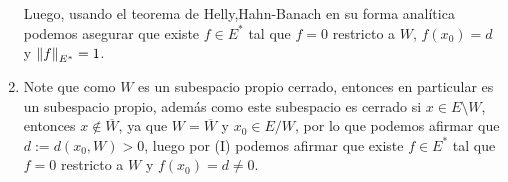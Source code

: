 \begin{homeworkProblem}
\begin{solution}
\begin{enumerate}
\begin{itemize}
        \end{itemize}
        Luego, usando el teorema de Helly,Hahn-Banach en su forma analítica podemos asegurar que existe $f\in E^{*}$ tal que $f=0$ restricto a $W$, $f(x_0)=d$ y $\left\|f\right\|_{E^{*}}=1$.
      \item Note que como $W$ es un subespacio propio cerrado, entonces en particular es un subespacio propio, además como este subespacio es cerrado si $x\in E\setminus W$, entonces $x\notin \overline{W}$, ya que $W=\overline{W}$ y $x_0\in E/W$, por lo que podemos afirmar que $d:=d(x_0,W)>0$, luego por (I) podemos afirmar que existe $f\in E^{*}$ tal que $f=0$ restricto a $W$ y $f(x_0)=d\neq 0$. 
    \end{enumerate}
  \end{solution}
\end{homeworkProblem}
